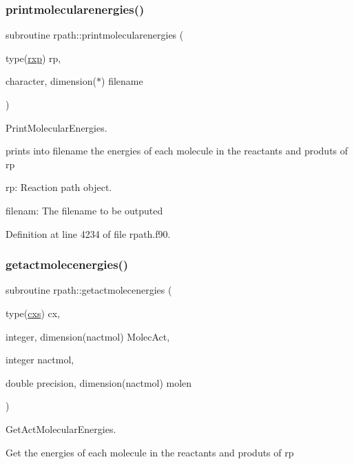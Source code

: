 \subsubsection{\texorpdfstring{printmolecularenergies()}{printmolecularenergies()}}
{\footnotesize\ttfamily subroutine rpath\+::printmolecularenergies (\begin{DoxyParamCaption}\item[{type(\mbox{\hyperlink{structrpath_1_1rxp}{rxp}})}]{rp,  }\item[{character, dimension($\ast$)}]{filename }\end{DoxyParamCaption})}



Print\+Molecular\+Energies. 

prints into filename the energies of each molecule in the reactants and produts of rp


\begin{DoxyItemize}
\item rp\+: Reaction path object.
\item filenam\+: The filename to be outputed 
\end{DoxyItemize}

Definition at line 4234 of file rpath.\+f90.

\mbox{\label{namespacerpath_ab03d1a925ddda8a471cc0faf8bc393c6}} 
\subsubsection{\texorpdfstring{getactmolecenergies()}{getactmolecenergies()}}
{\footnotesize\ttfamily subroutine rpath\+::getactmolecenergies (\begin{DoxyParamCaption}\item[{type(\mbox{\hyperlink{structchemstr_1_1cxs}{cxs}})}]{cx,  }\item[{integer, dimension(nactmol)}]{Molec\+Act,  }\item[{integer}]{nactmol,  }\item[{double precision, dimension(nactmol)}]{molen }\end{DoxyParamCaption})}



Get\+Act\+Molecular\+Energies. 

Get the energies of each molecule in the reactants and produts of rp


